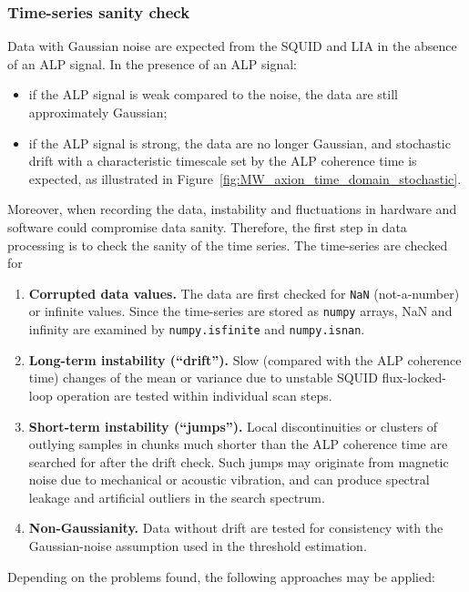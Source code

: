 \subsubsection{Time-series sanity check}

Data with Gaussian noise are expected from the SQUID and LIA in the absence of an ALP signal.
In the presence of an ALP signal:
\begin{itemize}
    \item if the ALP signal is weak compared to the noise, the data are still approximately Gaussian;
    \item if the ALP signal is strong, the data are no longer Gaussian, and stochastic drift with a characteristic timescale set by the ALP coherence time is expected, as illustrated in Figure~\ref{fig:MW_axion_time_domain_stochastic}.
\end{itemize}
Moreover, when recording the data, instability and fluctuations in hardware and software could compromise data sanity.
Therefore, the first step in data processing is to check the sanity of the time series.
The time-series are checked for
\begin{enumerate}
    \item \textbf{Corrupted data values.} The data are first checked for \texttt{NaN} (not-a-number) or infinite values. Since the time-series are stored as \texttt{numpy} arrays, NaN and infinity are examined by \texttt{numpy.isfinite} and \texttt{numpy.isnan}.
    \item \textbf{Long-term instability (``drift'').} Slow (compared with the ALP coherence time) changes of the mean or variance due to unstable SQUID flux-locked-loop operation are tested within individual scan steps.
    \item \textbf{Short-term instability (``jumps'').} Local discontinuities or clusters of outlying samples in chunks much shorter than the ALP coherence time are searched for after the drift check. Such jumps may originate from magnetic noise due to mechanical or acoustic vibration, and can produce spectral leakage and artificial outliers in the search spectrum.
    \item \textbf{Non-Gaussianity.} Data without drift are tested for consistency with the Gaussian-noise assumption used in the threshold estimation.
\end{enumerate}
Depending on the problems found, the following approaches may be applied:
